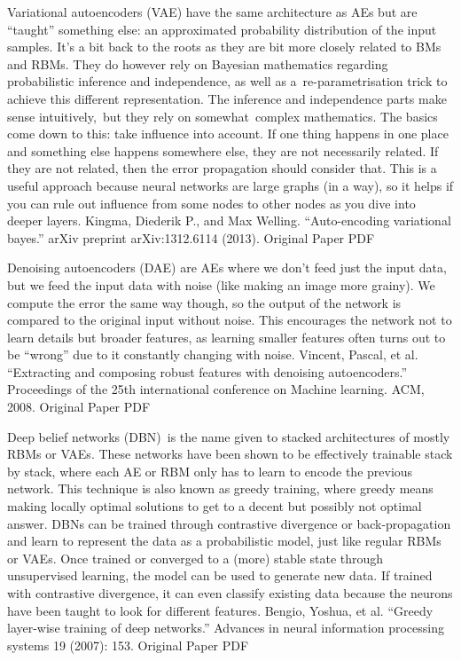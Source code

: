 \documentclass[11pt,a4paper,oneside]{ctexbook}
\begin{document}
Variational autoencoders (VAE) have the same architecture as AEs but are “taught” something else: an approximated probability distribution of the input samples. It’s a bit back to the roots as they are bit more closely related to BMs and RBMs. They do however rely on Bayesian mathematics regarding probabilistic inference and independence, as well as a re-parametrisation trick to achieve this different representation. The inference and independence parts make sense intuitively, but they rely on somewhat complex mathematics. The basics come down to this: take influence into account. If one thing happens in one place and something else happens somewhere else, they are not necessarily related. If they are not related, then the error propagation should consider that. This is a useful approach because neural networks are large graphs (in a way), so it helps if you can rule out influence from some nodes to other nodes as you dive into deeper layers.
Kingma, Diederik P., and Max Welling. “Auto-encoding variational bayes.” arXiv preprint arXiv:1312.6114 (2013).
Original Paper PDF


Denoising autoencoders (DAE) are AEs where we don’t feed just the input data, but we feed the input data with noise (like making an image more grainy). We compute the error the same way though, so the output of the network is compared to the original input without noise. This encourages the network not to learn details but broader features, as learning smaller features often turns out to be “wrong” due to it constantly changing with noise.
Vincent, Pascal, et al. “Extracting and composing robust features with denoising autoencoders.” Proceedings of the 25th international conference on Machine learning. ACM, 2008.
Original Paper PDF


Deep belief networks (DBN) is the name given to stacked architectures of mostly RBMs or VAEs. These networks have been shown to be effectively trainable stack by stack, where each AE or RBM only has to learn to encode the previous network. This technique is also known as greedy training, where greedy means making locally optimal solutions to get to a decent but possibly not optimal answer. DBNs can be trained through contrastive divergence or back-propagation and learn to represent the data as a probabilistic model, just like regular RBMs or VAEs. Once trained or converged to a (more) stable state through unsupervised learning, the model can be used to generate new data. If trained with contrastive divergence, it can even classify existing data because the neurons have been taught to look for different features.
Bengio, Yoshua, et al. “Greedy layer-wise training of deep networks.” Advances in neural information processing systems 19 (2007): 153.
Original Paper PDF
\end{document}
